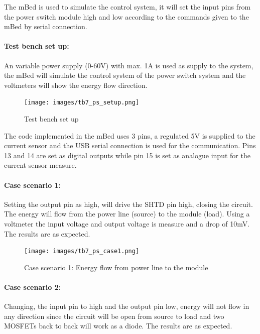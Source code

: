 The mBed is used to simulate the control system, it will set the input pins from the power switch module high and low according to the commands given to the mBed by serial connection.

\paragraph{Test bench set up:} An variable power supply (0-60V) with max. 1A is used as supply to the system, the mBed will simulate the control system of the power switch system and the voltmeters will show the energy flow direction.
\begin{figure}[H]
	\begin{centering}
		\texttt{[image: images/tb7\_ps\_setup.png]}
		\caption{Test bench set up}
	\end{centering}
\end{figure}

The code implemented in the mBed uses 3 pins, a regulated 5V is supplied to the current sensor and the USB serial connection is used for the communication. Pins 13 and 14 are set as digital outputs while pin 15 is set as analogue input for the current sensor measure.

\paragraph{Case scenario 1:} Setting the output pin as high, will drive the SHTD pin high, closing the circuit. The energy will flow from the power line (source) to the module (load). Using a voltmeter the input voltage and output voltage is measure and a drop of 10mV. The results are as expected.

\begin{figure}[H]
	\begin{centering}
		\texttt{[image: images/tb7\_ps\_case1.png]}
		\caption{Case scenario 1: Energy flow from power line to the module}
	\end{centering}
\end{figure}


\paragraph{Case scenario 2:}Changing, the input pin to high and the output pin low, energy will not flow in any direction since the circuit will be open from source to load and two MOSFETs back to back will work as a diode. The results are as expected.

